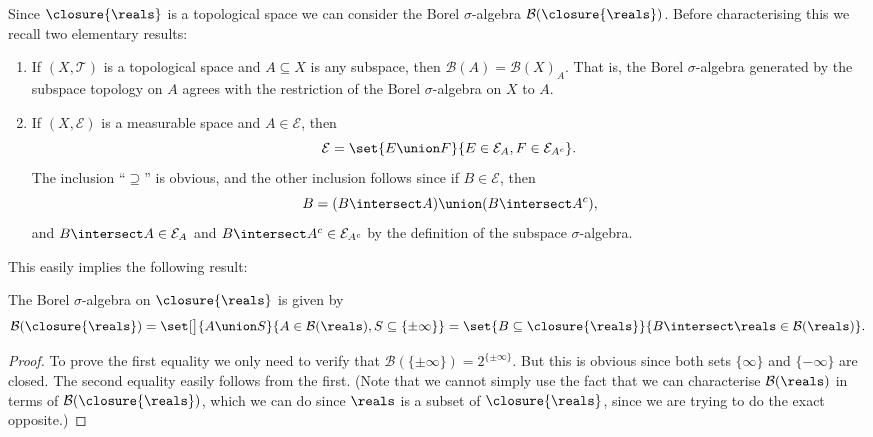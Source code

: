 \documentclass[article, a4paper, 11pt, oneside]{memoir}
\numberwithin{equation}{chapter}
\newcommand{\calT}{\mathcal{T}}
\newcommand{\calE}{\mathcal{E}}
\newcommand{\borel}{\mathcal{B}}
\newcommand{\exreals}{\closure{\reals}}
\begin{document}
Since $\exreals$ is a topological space we can consider the Borel $\sigma$-algebra $\borel(\exreals)$. Before characterising this we recall two elementary results:
%
\begin{enumerate}
    \item If $(X,\calT)$ is a topological space and $A \subseteq X$ is any subspace, then $\borel(A) = \borel(X)_A$. That is, the Borel $\sigma$-algebra generated by the subspace topology on $A$ agrees with the restriction of the Borel $\sigma$-algebra on $X$ to $A$.

    \item If $(X,\calE)$ is a measurable space and $A \in \calE$, then
    \begin{equation*}
        \calE
            = \set{E \union F}{E \in \calE_A, F \in \calE_{A^c}}.
    \end{equation*}
    The inclusion \enquote{$\supseteq$} is obvious, and the other inclusion follows since if $B \in \calE$, then
    \begin{equation*}
        B
            = (B \intersect A) \union (B \intersect A^c),
    \end{equation*}
    and $B \intersect A \in \calE_A$ and $B \intersect A^c \in \calE_{A^c}$ by the definition of the subspace $\sigma$-algebra.
\end{enumerate}
%
This easily implies the following result:

\begin{proposition}
    The Borel $\sigma$-algebra on $\exreals$ is given by
    \begin{equation*}
        \borel(\exreals)
            = \set[\big]{A \union S}{A \in \borel(\reals), S \subseteq \{\pm\infty\}}
            = \set{B \subseteq \exreals}{B \intersect \reals \in \borel(\reals)}.
    \end{equation*}
\end{proposition}

\begin{proof}
    To prove the first equality we only need to verify that $\borel(\{\pm\infty\}) = 2^{\{\pm\infty\}}$. But this is obvious since both sets $\{\infty\}$ and $\{-\infty\}$ are closed. The second equality easily follows from the first. (Note that we cannot simply use the fact that we can characterise $\borel(\reals)$ in terms of $\borel(\exreals)$, which we can do since $\reals$ is a subset of $\exreals$, since we are trying to do the exact opposite.)
\end{proof}

\nocite{*}

\printbibliography
\end{document}
